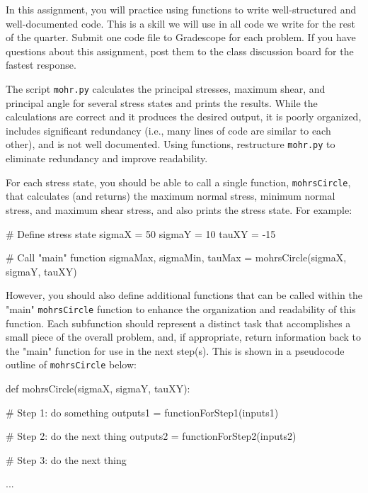 \documentclass{homework}
\begin{document}
\maketitle

In this assignment, you will practice using functions to write well-structured and well-documented code. This is a skill we will use in all code we write for the rest of the quarter. Submit one code file to Gradescope for each problem. If you have questions about this assignment, post them to the class discussion board for the fastest response.

The script \texttt{mohr.py} calculates the principal stresses, maximum shear, and principal angle for several stress states and prints the results. While the calculations are correct and it produces the desired output, it is poorly organized, includes significant redundancy (i.e., many lines of code are similar to each other), and is not well documented. Using functions, restructure \texttt{mohr.py} to eliminate redundancy and improve readability. 

For each stress state, you should be able to call a single function, \texttt{mohrsCircle}, that calculates (and returns) the maximum normal stress, minimum normal stress, and maximum shear stress, and also prints the stress state. For example:

\begin{python}
# Define stress state
sigmaX = 50 
sigmaY = 10 
tauXY = -15 

# Call "main" function
sigmaMax, sigmaMin, tauMax = mohrsCircle(sigmaX, sigmaY, tauXY)
\end{python}

However, you should also define additional functions that can be called within the "main" \texttt{mohrsCircle} function to enhance the organization and readability of this function. Each subfunction should represent a distinct task that accomplishes a small piece of the overall problem, and, if appropriate, return information back to the "main" function for use in the next step(s). This is shown in a pseudocode outline of \texttt{mohrsCircle} below:

\begin{python}
def mohrsCircle(sigmaX, sigmaY, tauXY):

    # Step 1: do something
    outputs1 = functionForStep1(inputs1)

    # Step 2: do the next thing
    outputs2 = functionForStep2(inputs2)

    # Step 3: do the next thing

    ...

\end{python}
\end{document}
